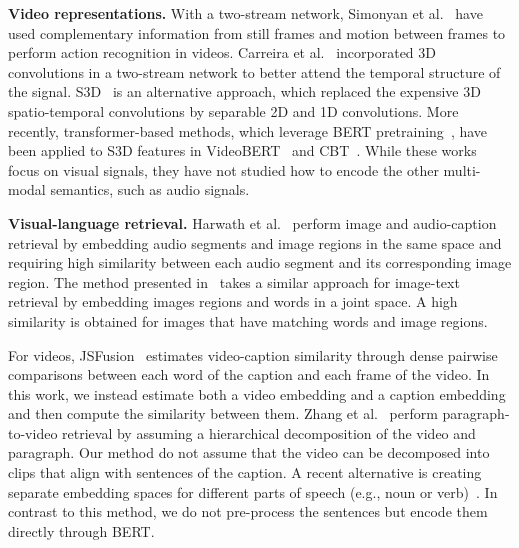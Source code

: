 \documentclass[runningheads]{llncs}
\begin{document}
\vspace{0.2cm}
\noindent \textbf{Video representations.} With a two-stream network, Simonyan et al.~\cite{Simonyan2014TwoStream} have used complementary information from still frames and motion between frames to perform action recognition in videos. Carreira et al.~\cite{Carreira2017Conv3D} incorporated 3D convolutions in a two-stream network to better attend the temporal structure of the signal. S3D~\cite{Xie2017S3D} is an alternative approach, which replaced the expensive 3D spatio-temporal convolutions by separable 2D and 1D convolutions.
More recently, transformer-based methods, which leverage BERT pretraining~\cite{devlin2018bert}, have been applied to S3D features in VideoBERT~\cite{Sun2019VideoBERT} and CBT~\cite{Sun2019cbt}.
While these works focus on visual signals, they have not studied how to encode the other multi-modal semantics, such as audio signals.

\vspace{0.2cm}
\noindent \textbf{Visual-language retrieval.} Harwath et al.~\cite{Harwath2018} perform image and audio-caption retrieval by embedding audio segments and image regions in the same space and requiring high similarity between each audio segment and its corresponding image region. The method presented in~\cite{lee2018stacked} takes a similar approach for image-text retrieval by embedding images regions and words in a joint space. A high similarity is obtained for images that have matching words and image regions.

For videos, JSFusion~\cite{Yu2018JSFusion} estimates video-caption similarity through dense pairwise comparisons between each word of the caption and each frame of the video. In this work, we instead estimate both a video embedding and a caption embedding and then compute the similarity between them. Zhang et al.~\cite{zhang2018HSE} perform paragraph-to-video retrieval by assuming a hierarchical decomposition of the video and paragraph. Our method do not assume that the video can be decomposed into clips that align with sentences of the caption. A recent alternative is creating separate embedding spaces for different parts of speech (e.g., noun or verb)~\cite{wray2019finegrained}. In contrast to this method, we do not pre-process the sentences but encode them directly through BERT.
\end{document}
